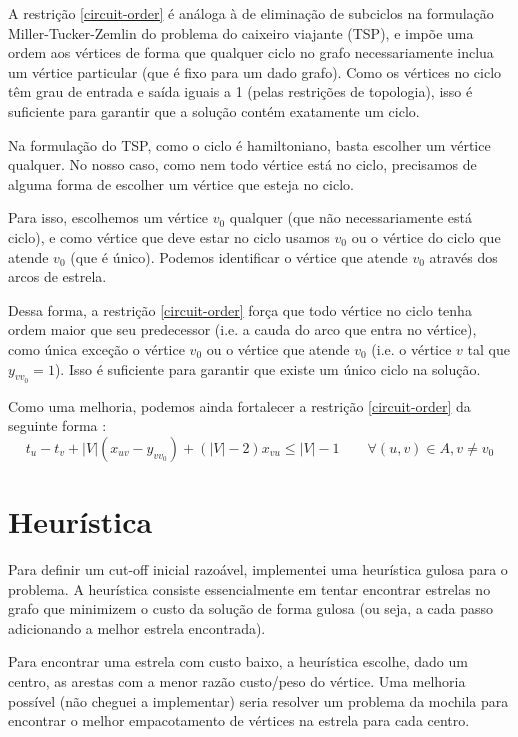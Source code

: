 \documentclass{article}
\begin{document}
A restrição \ref{circuit-order} é análoga à de eliminação de subciclos na formulação Miller-Tucker-Zemlin do problema do caixeiro viajante (TSP), e impõe uma ordem aos vértices de forma que qualquer ciclo no grafo necessariamente inclua um vértice particular (que é fixo para um dado grafo). Como os vértices no ciclo têm grau de entrada e saída iguais a 1 (pelas restrições de topologia), isso é suficiente para garantir que a solução contém exatamente um ciclo.

Na formulação do TSP, como o ciclo é hamiltoniano, basta escolher um vértice qualquer. No nosso caso, como nem todo vértice está no ciclo, precisamos de alguma forma de escolher um vértice que esteja no ciclo.

Para isso, escolhemos um vértice $v_0$ qualquer (que não necessariamente está ciclo), e como vértice que deve estar no ciclo usamos $v_0$ ou o vértice do ciclo que atende $v_0$ (que é único). Podemos identificar o vértice que atende $v_0$ através dos arcos de estrela.

Dessa forma, a restrição \ref{circuit-order} força que todo vértice no ciclo tenha ordem maior que seu predecessor (i.e. a cauda do arco que entra no vértice), como única exceção o vértice $v_0$ ou o vértice que atende $v_0$ (i.e. o vértice $v$ tal que $y_{vv_0} = 1$). Isso é suficiente para garantir que existe um único ciclo na solução.

Como uma melhoria, podemos ainda fortalecer a restrição \ref{circuit-order} da seguinte forma \cite{DESROCHERS199127}:
$$t_u - t_v + |V|(x_{uv} - y_{vv_0}) + (|V| - 2)x_{vu} \leq |V| - 1 \qquad \forall (u, v) \in A, v \neq v_0$$

\section{Heurística}

Para definir um cut-off inicial razoável, implementei uma heurística gulosa para o problema. A heurística consiste essencialmente em tentar encontrar estrelas no grafo que minimizem o custo da solução de forma gulosa (ou seja, a cada passo adicionando a melhor estrela encontrada).

Para encontrar uma estrela com custo baixo, a heurística escolhe, dado um centro, as arestas com a menor razão custo/peso do vértice. Uma melhoria possível (não cheguei a implementar) seria resolver um problema da mochila para encontrar o melhor empacotamento de vértices na estrela para cada centro.
\end{document}
